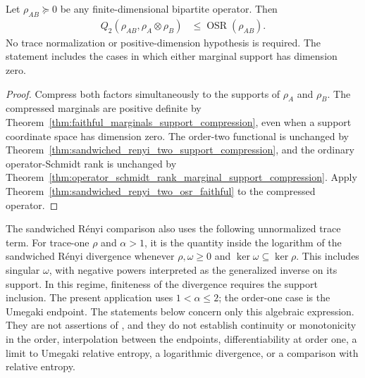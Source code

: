 \begin{theorem}
    \label{thm:sandwiched_renyi_two_osr_support}
    \leanok
    Let $\rho_{AB}\succeq0$ be any finite-dimensional bipartite operator. Then
    \begin{align}
        Q_2(\rho_{AB},\rho_A\otimes\rho_B)
         & \leq\operatorname{OSR}(\rho_{AB}).
        \label{eq:mpdo_support_q2_osr}
    \end{align}
    No trace normalization or positive-dimension hypothesis is required. The
    statement includes the cases in which either marginal support has
    dimension zero.
\end{theorem}

\begin{proof}\leanok
    Compress both factors simultaneously to the supports of $\rho_A$ and
    $\rho_B$. The compressed marginals are positive definite by
    Theorem~\ref{thm:faithful_marginals_support_compression}, even when a
    support coordinate space has dimension zero. The order-two functional is
    unchanged by
    Theorem~\ref{thm:sandwiched_renyi_two_support_compression}, and the
    ordinary operator-Schmidt rank is unchanged by
    Theorem~\ref{thm:operator_schmidt_rank_marginal_support_compression}.
    Apply Theorem~\ref{thm:sandwiched_renyi_two_osr_faithful} to the compressed
    operator.
\end{proof}

The sandwiched R\'enyi comparison also uses the following unnormalized
trace term.  For trace-one $\rho$ and $\alpha>1$, it is the quantity inside the
logarithm of the sandwiched R\'enyi divergence
\cite[Equation~(3)]{Beigi2013Sandwiched}
\cite[Definition~2]{MullerLennert2013Renyi} whenever
$\rho,\omega\geq0$ and $\ker\omega\subseteq\ker\rho$.  This includes singular
$\omega$, with negative powers interpreted as the generalized inverse on its
support.  In this regime, finiteness of the divergence requires the support
inclusion.  The present application uses $1<\alpha\leq2$; the order-one case is
the Umegaki endpoint.  The statements below concern only this algebraic
expression.  They are not assertions of
\cite[Proposition~4.5]{Cirac2016MPDO_arXiv}, and they do not establish
continuity or monotonicity in the order, interpolation between the endpoints,
differentiability at order one, a limit to Umegaki relative entropy, a
logarithmic divergence, or a comparison with relative entropy.

